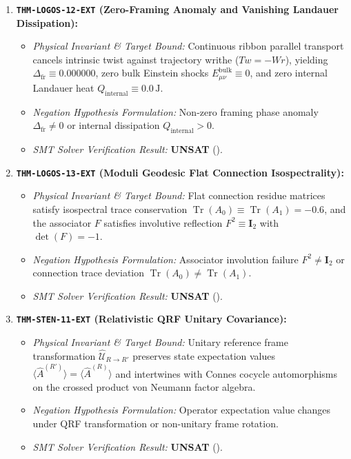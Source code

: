 \documentclass[11pt,onecolumn]{article}
\DeclareMathOperator{\Tr}{Tr}
\begin{document}
\begin{enumerate}
    \item \textbf{\texttt{THM-LOGOS-12-EXT} (Zero-Framing Anomaly and Vanishing Landauer Dissipation):}
    \begin{itemize}
        \item \emph{Physical Invariant \& Target Bound:} Continuous ribbon parallel transport cancels intrinsic twist against trajectory writhe ($Tw = -Wr$), yielding $\Delta_{\text{fr}} \equiv 0.000000$, zero bulk Einstein shocks $E_{\mu\nu}^{\text{bulk}} \equiv 0$, and zero internal Landauer heat $Q_{\text{internal}} \equiv 0.0\,\text{J}$.
        \item \emph{Negation Hypothesis Formulation:} Non-zero framing phase anomaly $\Delta_{\text{fr}} \neq 0$ or internal dissipation $Q_{\text{internal}} > 0$.
        \item \emph{SMT Solver Verification Result:} \textbf{UNSAT} ().
    \end{itemize}

    \item \textbf{\texttt{THM-LOGOS-13-EXT} (Moduli Geodesic Flat Connection Isospectrality):}
    \begin{itemize}
        \item \emph{Physical Invariant \& Target Bound:} Flat connection residue matrices satisfy isospectral trace conservation $\Tr(A_0) \equiv \Tr(A_1) = -0.6$, and the associator $F$ satisfies involutive reflection $F^2 \equiv \mathbf{I}_2$ with $\det(F) = -1$.
        \item \emph{Negation Hypothesis Formulation:} Associator involution failure $F^2 \neq \mathbf{I}_2$ or connection trace deviation $\Tr(A_0) \neq \Tr(A_1)$.
        \item \emph{SMT Solver Verification Result:} \textbf{UNSAT} ().
    \end{itemize}

    \item \textbf{\texttt{THM-STEN-11-EXT} (Relativistic QRF Unitary Covariance):}
    \begin{itemize}
        \item \emph{Physical Invariant \& Target Bound:} Unitary reference frame transformation $\hat{\mathcal{U}}_{R \to R'}$ preserves state expectation values $\langle \hat{A}^{(R')} \rangle = \langle \hat{A}^{(R)} \rangle$ and intertwines with Connes cocycle automorphisms on the crossed product von Neumann factor algebra.
        \item \emph{Negation Hypothesis Formulation:} Operator expectation value changes under QRF transformation or non-unitary frame rotation.
        \item \emph{SMT Solver Verification Result:} \textbf{UNSAT} ().
    \end{itemize}


\end{enumerate}
\end{document}
